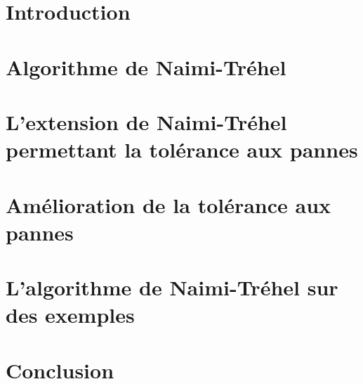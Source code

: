 \documentclass[a4paper,12pt]{article}
\title{\psubject}
\author{Raimana BOUISSOU, Tom GIMENEZ, Léo JECPAS}
\date{}
\newcommand{\nt}{Naimi-Tréhel }
\begin{document}
\maketitle

\section{Introduction}


\section{Algorithme de \nt}


\section{L'extension de \nt permettant la tolérance aux pannes}


\section{Amélioration de la tolérance aux pannes}


\section{L'algorithme de \nt sur des exemples}


\section{Conclusion}

\end{document}
